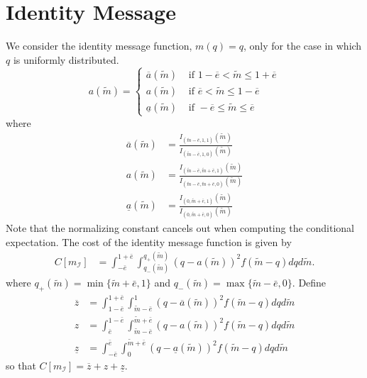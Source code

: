\documentclass{article}
\begin{document}
\section{Identity Message}
We consider the identity message function, $m(q)=q$, only for the case in which $q$ is uniformly distributed. 
\begin{equation}
	a(\widetilde{m})=
	\begin{cases}
		\overline{a}(\widetilde{m}) & \text{ if } 1-\overline{e}<\widetilde{m}\leq 1+\overline{e}\\
		a(\widetilde{m}) & \text{ if } \overline{e}<\widetilde{m}\leq 1-\overline{e}\\
		\underline{a}(\widetilde{m}) & \text{ if } -\overline{e}\leq\widetilde{m}\leq \overline{e}
	\end{cases}
\end{equation}
where
\begin{align}
	\overline{a}(\widetilde{m})&=\frac{I_{(\widetilde{m}-\bar{e},1,1)}(\widetilde{m})}{I_{(\widetilde{m}-\bar{e},1,0)}(\widetilde{m})}\\
	a(\widetilde{m})&=\frac{I_{(\widetilde{m}-\bar{e},\widetilde{m}+\bar{e},1)}(\widetilde{m})}{I_{(\widetilde{m}-\bar{e},\widetilde{m}+\bar{e},0)}(\widetilde{m})}\\
	\underline{a}(\widetilde{m})&=\frac{I_{(0,\widetilde{m}+\bar{e},1)}(\widetilde{m})}{I_{(0,\widetilde{m}+\bar{e},0)}(\widetilde{m})}
\end{align}
Note that the normalizing constant cancels out when computing the conditional expectation. The cost of the identity message function is given by
\begin{align}
	C[m_{\mathcal{I}}]&=\int_{-\bar{e}}^{1+\bar{e}}{\int_{q_{-}(\widetilde{m})}^{q_{+}(\widetilde{m})}{(q-a(\widetilde{m}))^{2}f(\widetilde{m}-q)dq}d\widetilde{m}}.
\end{align}
where $q_{+}(\widetilde{m})=\min\{\widetilde{m}+\bar{e},1\}$ and $q_{-}(\widetilde{m})=\max\{\widetilde{m}-\bar{e},0\}$. Define
\begin{align}
	\overline{z}&=\int_{1-\bar{e}}^{1+\bar{e}}{\int_{\widetilde{m}-\bar{e}}^{1}{(q-\overline{a}(\widetilde{m}))^{2}f(\widetilde{m}-q)dq}d\widetilde{m}}\\
	z&=\int_{\bar{e}}^{1-\bar{e}}{\int_{\widetilde{m}-\bar{e}}^{\widetilde{m}+\bar{e}}{(q-a(\widetilde{m}))^{2}f(\widetilde{m}-q)dq}d\widetilde{m}}\\
	\underline{z}&=\int_{-\bar{e}}^{\bar{e}}{\int_{0}^{\widetilde{m}+\bar{e}}{(q-\underline{a}(\widetilde{m}))^{2}f(\widetilde{m}-q)dq}d\widetilde{m}}
\end{align}
so that $C[m_{\mathcal{I}}]=\overline{z}+z+\underline{z}$.
\end{document}
